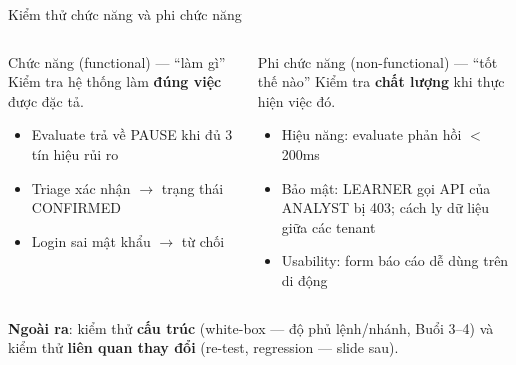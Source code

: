 \documentclass[aspectratio=169,12pt]{beamer}
\begin{document}
\begin{frame}{Kiểm thử chức năng và phi chức năng}
  \begin{columns}[T]
    \begin{block}{Chức năng (functional) --- ``làm gì''\vphantom{ỹể}}
      \small Kiểm tra hệ thống làm \textbf{đúng việc} được đặc tả.
      \begin{itemize}
        \item \small Evaluate trả về PAUSE khi đủ 3 tín hiệu rủi ro
        \item \small Triage xác nhận $\to$ trạng thái CONFIRMED
        \item \small Login sai mật khẩu $\to$ từ chối
      \end{itemize}
    \end{block}
    \begin{block}{Phi chức năng (non-functional) --- ``tốt thế nào''\vphantom{ỹể}}
      \small Kiểm tra \textbf{chất lượng} khi thực hiện việc đó.
      \begin{itemize}
        \item \small Hiệu năng: evaluate phản hồi $<$ 200ms
        \item \small Bảo mật: LEARNER gọi API của ANALYST bị 403; cách ly dữ liệu giữa các tenant
        \item \small Usability: form báo cáo dễ dùng trên di động
      \end{itemize}
    \end{block}
  \end{columns}

  \vspace{0.3em}
  {\small \textbf{Ngoài ra}: kiểm thử \textbf{cấu trúc} (white-box --- độ phủ
  lệnh/nhánh, Buổi 3--4) và kiểm thử \textbf{liên quan thay đổi}
  (re-test, regression --- slide sau).}
\end{frame}
\end{document}
